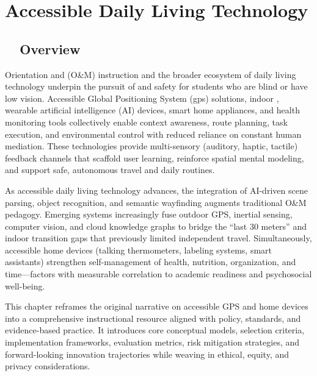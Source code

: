 \chapter{Accessible Daily Living Technology}\label{ch8:chap:accessible-daily-living}

\section{~~Overview}\label{ch8:sec:overview}
Orientation and  (O\&M) instruction and the broader ecosystem of daily living \gls{technology} underpin the pursuit of  and \gls{safety} for students who are blind or have low vision.\supercite{Holbrook2006, Kelly2011, OrientationMobilityInstruction} Accessible Global Positioning System (\gls{gps}) solutions, indoor , wearable artificial intelligence (AI) devices, smart home appliances, and health monitoring tools collectively enable context awareness, route planning, task execution, and environmental control with reduced reliance on constant human mediation.\supercite{AFBGPS2023, AEMCenter} These technologies provide multi-sensory (auditory, haptic, tactile) feedback channels that scaffold user learning, reinforce spatial mental modeling, and support safe, autonomous travel and daily routines.\supercite{InclusiveCityMaker2023, WeWALK, navilens}

As accessible daily living technology advances, the integration of AI-driven scene parsing, object recognition, and semantic wayfinding augments traditional O\&M pedagogy.\supercite{msseeingai, envision, bipedai, aimodels2024} Emerging systems increasingly fuse outdoor GPS, inertial sensing, computer vision, and cloud knowledge graphs to bridge the “last 30 meters” and indoor transition gaps that previously limited independent travel.\supercite{navilens} Simultaneously, accessible home devices (talking thermometers, labeling systems, smart assistants) strengthen self-management of health, nutrition, organization, and time—factors with measurable correlation to academic readiness and psychosocial well-being.\supercite{StudentOutcomesResearch, wjaets2024, AllAboutVision2023}

This chapter reframes the original narrative on accessible GPS and home devices into a comprehensive instructional resource aligned with policy, standards, and evidence-based practice. It introduces core conceptual models, selection criteria, implementation frameworks, evaluation metrics, risk mitigation strategies, and forward-looking innovation trajectories while weaving in ethical, equity, and privacy considerations.\supercite{ADA1990, Section508, AI_Ethics_Bias, Bias_in_AI, DataPrivacyAI}

